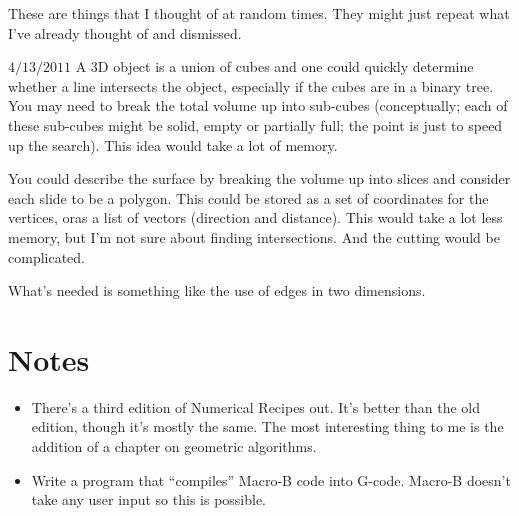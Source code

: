 \documentclass[titlepage,oneside,10pt]{article}
\begin{document}
These are things that I thought of at random times. They might just
repeat what I've already thought of and dismissed.

$4/13/2011$ A 3D object is a union of cubes and one could quickly
determine whether a line intersects the object, especially if the
cubes are in a binary tree. You may need to break the total volume up
into sub-cubes (conceptually; each of these sub-cubes might be solid,
empty or partially full; the point is just to speed up the
search). This idea would take a lot of memory.

You could describe the surface by breaking the volume up into slices
and consider each slide to be a polygon. This could be stored as a set
of coordinates for the vertices, oras a list of vectors (direction and
distance). This would take a lot less memory, but I'm not sure about
finding intersections. And the cutting would be complicated.

What's needed is something like the use of edges in two dimensions. 



\section{Notes}

\begin{itemize}
\item There's a third edition of Numerical Recipes out. It's better
  than the old edition, though it's mostly the same. The most
  interesting thing to me is the addition of a chapter on geometric
  algorithms.
\item Write a program that ``compiles'' Macro-B code into
  G-code. Macro-B doesn't take any user input so this is possible.
\end{itemize}
\end{document}
